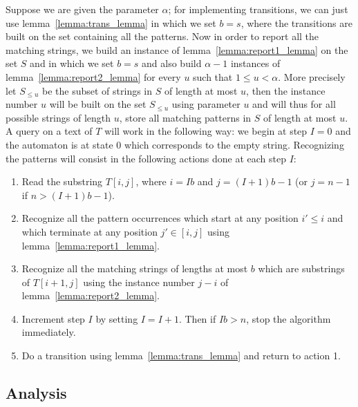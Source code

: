 \documentclass{article}
\newcommand{\?}{\mskip1.5mu}
\begin{document}
Suppose we are given the parameter $\alpha$; for implementing transitions, we can just use lemma~\ref{lemma:trans_lemma} in which we set $b=s$, where the transitions are built on the set containing all the patterns. Now in order to report all the matching strings, we build an instance of lemma~\ref{lemma:report1_lemma} on the set $S$ and in which we set $b=s$ and also build $\alpha-1$ instances of lemma~\ref{lemma:report2_lemma} for every $u$ such that $1\leq u<\alpha$. More precisely let $S_{\leq u}$ be the subset of strings in $S$ of length at most $u$, then the instance number $u$ will be built on the set $S_{\leq u}$ using parameter $u$ and will thus for all possible strings of length $u$, store all matching patterns in $S$ of length at most $u$.  
\\ A query on a text of $T$ will work in the following way: we begin at step $I=0$ and the automaton is at state $0$ which corresponds to the empty string. Recognizing the patterns will consist in the following actions done at each step $I$: 
\begin{enumerate}
\item Read the substring $T[i,j]$, where $i=Ib$ and $j=(I+1)b-1$ (or $j=n-1$ if $n>(I+1)b-1$). 
\item Recognize all the pattern occurrences which start at any position $i'\leq i$ and which terminate at any position $j'\in [i,j]$ using lemma~\ref{lemma:report1_lemma}. 
\item Recognize all the matching strings of lengths at most $b$ which are substrings of $T[i+1,j]$ using the instance number $j-i$ of lemma~\ref{lemma:report2_lemma}.
\item Increment step $I$ by setting $I=I+1$. Then if $Ib>n$, stop the algorithm immediately. 
\item Do a transition using lemma~\ref{lemma:trans_lemma} and return to action 1. 
\end{enumerate}
\subsection{Analysis}
\end{document}

